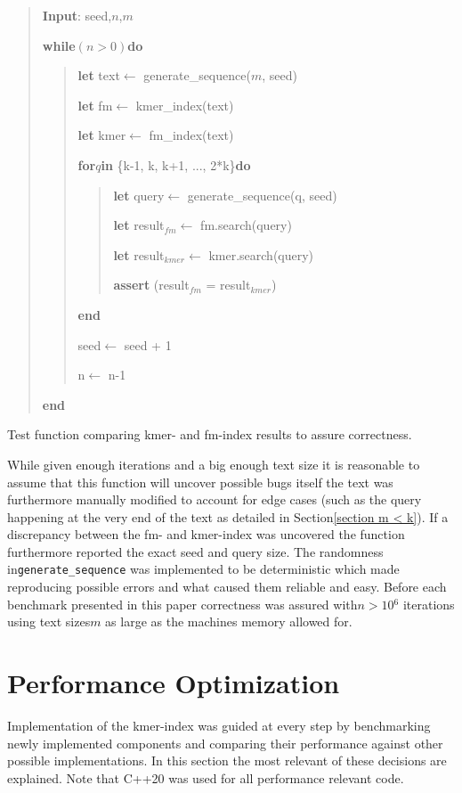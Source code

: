 \begin{algorithm}[H]
\begin{verse}
\textbf{Input}: seed,$n$,$m$

\textbf{while}$(n>0)$\textbf{do}
\begin{verse}
\textbf{let} text$\leftarrow$ generate\_sequence($m$, seed)

\textbf{let} fm$\leftarrow$ kmer\_index(text)

\textbf{let} kmer$\leftarrow$ fm\_index(text)

\textbf{for}$q$\textbf{in} \{k-1, k, k+1, ..., 2{*}k\}\textbf{do}
\begin{verse}
\textbf{let} query$\leftarrow$ generate\_sequence(q, seed)

\textbf{let} result$_{fm}$$\leftarrow$ fm.search(query)

\textbf{let} result$_{kmer}$$\leftarrow$ kmer.search(query)

\textbf{assert} (result$_{fm}$ = result$_{kmer}$)
\end{verse}
\textbf{end}

seed$\leftarrow$ seed + 1

n$\leftarrow$ n-1
\end{verse}
\textbf{end}
\end{verse}
\caption{Test function comparing kmer- and fm-index results to assure correctness.}
\end{algorithm}

While given enough iterations and a big enough text size it is reasonable
to assume that this function will uncover possible bugs itself the
text was furthermore manually modified to account for edge cases (such
as the query happening at the very end of the text as detailed in
Section\ref{section m < k}). If a discrepancy between the fm- and
kmer-index was uncovered the function furthermore reported the exact
seed and query size. The randomness in\lstinline{generate_sequence}
was implemented to be deterministic which made reproducing possible
errors and what caused them reliable and easy. Before each benchmark
presented in this paper correctness was assured with$n>10{{}^6}$
iterations using text sizes$m$ as large as the machines memory allowed
for.

\section{Performance Optimization}

Implementation of the kmer-index was guided at every step by benchmarking
newly implemented components and comparing their performance against
other possible implementations. In this section the most relevant
of these decisions are explained. Note that C++20 was used for all
performance relevant code.

